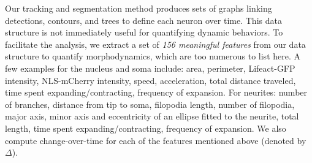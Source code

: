 \vspace{-3mm} Our  tracking and  segmentation method produces  sets of
graphs linking  detections, contours, and trees to  define each neuron
over  time.  This  data   structure  is  not  immediately  useful  for
quantifying dynamic behaviors.  To facilitate the analysis, we extract
a  set of {\em  156 meaningful  features} from  our data  structure to
quantify morphodynamics, which  are too numerous to list  here.  A few
examples  for   the  nucleus   and  soma  include:   area,  perimeter,
Lifeact-GFP  intensity,  NLS-mCherry  intensity, speed,  acceleration,
total distance  traveled, time spent  expanding/contracting, frequency
of expansion.  For neurites: number  of branches, distance from tip to
soma, filopodia  length, number of  filopodia, major axis,  minor axis
and eccentricity of an ellipse fitted to the neurite, total length, time
spent expanding/contracting, frequency of expansion. We also compute
change-over-time for each of the features mentioned above 
(denoted by $\Delta$).


